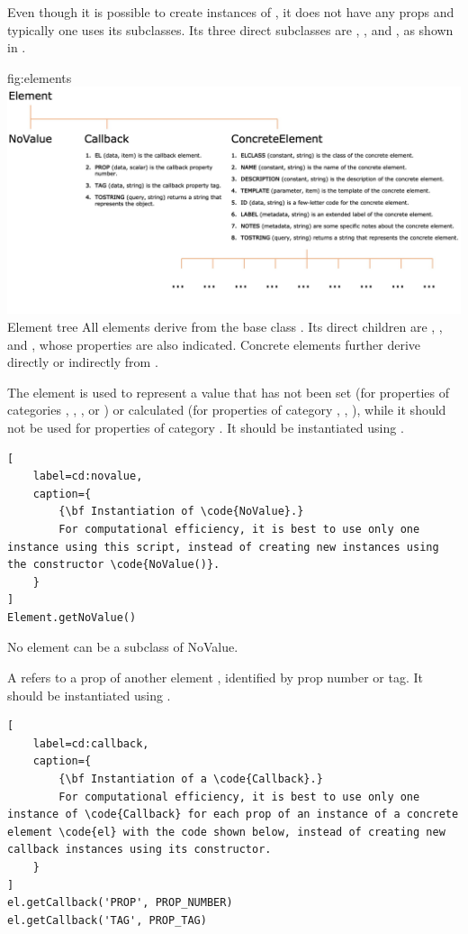 \documentclass{tufte-handout}
\begin{document}
Even though it is possible to create instances of , it does not have any props and typically one uses its subclasses.
Its three direct subclasses are , , and , as shown in .

	{fig:elements}
	{\includegraphics{fig01_big.jpg}}
	{Element tree}
	{
	All elements derive from the base class . 
	Its direct children are , , and , whose properties are also indicated.
	Concrete elements further derive directly or indirectly from .
	}


The element  is used to represent a value that has not been set (for properties of categories , , ,  or ) or calculated (for properties of category , , ), while it should not be used for properties of category .
It should be instantiated using .

\begin{lstlisting}[
	label=cd:novalue,
	caption={
		{\bf Instantiation of \code{NoValue}.}
		For computational efficiency, it is best to use only one instance using this script, instead of creating new instances using the constructor \code{NoValue()}. 
	}
]
Element.getNoValue()
\end{lstlisting}

No element can be a subclass of NoValue.
  
A  refers to a prop of another element , identified by prop number or tag.
It should be instantiated using .

\begin{lstlisting}[
	label=cd:callback,
	caption={
		{\bf Instantiation of a \code{Callback}.}
		For computational efficiency, it is best to use only one instance of \code{Callback} for each prop of an instance of a concrete element \code{el} with the code shown below, instead of creating new callback instances using its constructor. 
	}
]
el.getCallback('PROP', PROP_NUMBER)
el.getCallback('TAG', PROP_TAG)
\end{lstlisting}
\end{document}
